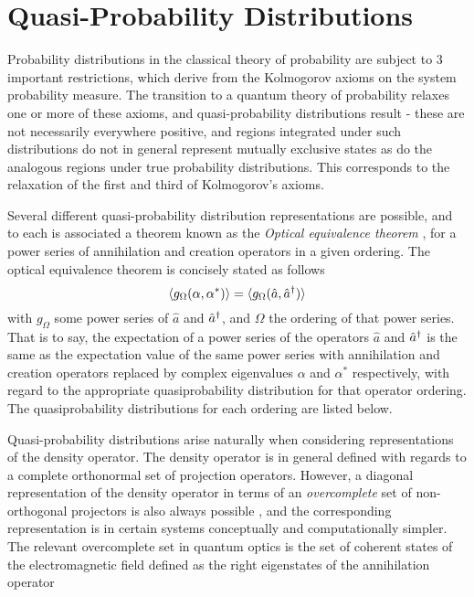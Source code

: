
\section{Quasi-Probability Distributions}
Probability distributions in the classical theory of probability are subject to 3 important restrictions, which derive from the Kolmogorov axioms on the system probability measure. The transition to a quantum theory of probability relaxes one or more of these axioms, and quasi-probability distributions result - these are not necessarily everywhere positive, and regions integrated under such distributions do not in general represent mutually exclusive states as do the analogous regions under true probability distributions. This corresponds to the relaxation of the first and third of Kolmogorov's axioms. 

Several different quasi-probability distribution representations are possible\autocite{Walls2008}, and to each is associated a theorem known as the \emph{Optical equivalence theorem} \autocite{Sudarshan1963}, for a power series of annihilation and creation operators in a given ordering. The optical equivalence theorem is concisely stated as follows
\begin{equation}
	\langle g_{\Omega} (\alpha, \alpha^*) \rangle = \langle g_{\Omega} (\hat{a}, \hat{a}^\dagger) \rangle
\end{equation}
with $g_\Omega$ some power series of $\hat{a}$ and $\hat{a}^\dagger$, and $\Omega$ the ordering of that power series. That is to say, the expectation of a power series of the operators $\hat{a}$ and $\hat{a}^\dagger$ is the same as the expectation value of the same power series with annihilation and creation operators replaced by complex eigenvalues $\alpha$ and $\alpha^*$ respectively, with regard to the appropriate quasiprobability distribution for that operator ordering. The quasiprobability distributions for each ordering are listed below.

Quasi-probability distributions arise naturally when considering representations of the density operator. The density operator is in general defined with regards to a complete orthonormal set of projection operators. However, a diagonal representation of the density operator in terms of an \emph{overcomplete} set of non-orthogonal projectors is also always possible \autocite{Sudarshan1963}, and the corresponding representation is in certain systems conceptually and computationally simpler. The relevant overcomplete set in quantum optics is the set of coherent states of the electromagnetic field defined as the right eigenstates of the annihilation operator

